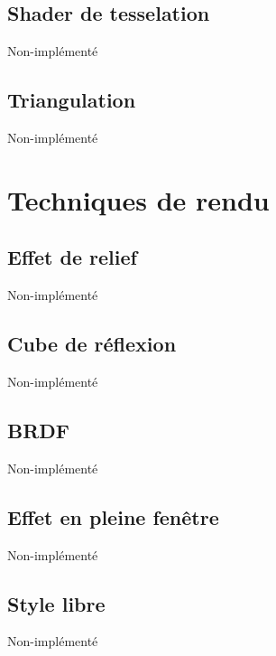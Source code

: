 \subsection{Shader de tesselation}
Non-implémenté

\subsection{Triangulation}
Non-implémenté


\pagebreak
\section{Techniques de rendu}
\subsection{Effet de relief}
Non-implémenté

\subsection{Cube de réflexion}
Non-implémenté

\subsection{BRDF}
Non-implémenté

\subsection{Effet en pleine fenêtre}
Non-implémenté

\subsection{Style libre}
Non-implémenté

